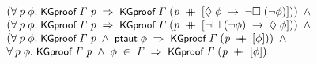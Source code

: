 \documentclass[letterpaper]{article}
\renewcommand{\HOLConst}[1]{{\textsf{\upshape\small #1}}}
\newenvironment{holmath}{\begin{displaymath}\begin{array}{l}}{\end{array}\end{displaymath}\ignorespacesafterend}
\begin{document}
\begin{holmath}
\;\;\;\;\;(\HOLSymConst{\HOLTokenForall{}}\HOLBoundVar{p}\;\HOLBoundVar{\ensuremath{\phi}}.\;\HOLConst{KGproof}\;\HOLFreeVar{\ensuremath{\Gamma}}\;\HOLBoundVar{p}\;\HOLSymConst{\HOLTokenImp{}}\;\HOLConst{KGproof}\;\HOLFreeVar{\ensuremath{\Gamma}}\;(\HOLBoundVar{p}\;\HOLSymConst{\HOLTokenDoublePlus}\;[\HOLSymConst{\ensuremath{\Diamond}}\;\HOLBoundVar{\ensuremath{\phi}}\;\HOLSymConst{\ensuremath{\rightarrow}}\;\HOLSymConst{\HOLTokenNeg{}}\HOLSymConst{\ensuremath{\Box}}\;(\HOLSymConst{\HOLTokenNeg{}}\HOLBoundVar{\ensuremath{\phi}})]))\;\HOLSymConst{\HOLTokenConj{}}\\
\;\;\;\;\;(\HOLSymConst{\HOLTokenForall{}}\HOLBoundVar{p}\;\HOLBoundVar{\ensuremath{\phi}}.\;\HOLConst{KGproof}\;\HOLFreeVar{\ensuremath{\Gamma}}\;\HOLBoundVar{p}\;\HOLSymConst{\HOLTokenImp{}}\;\HOLConst{KGproof}\;\HOLFreeVar{\ensuremath{\Gamma}}\;(\HOLBoundVar{p}\;\HOLSymConst{\HOLTokenDoublePlus}\;[\HOLSymConst{\HOLTokenNeg{}}\HOLSymConst{\ensuremath{\Box}}\;(\HOLSymConst{\HOLTokenNeg{}}\HOLBoundVar{\ensuremath{\phi}})\;\HOLSymConst{\ensuremath{\rightarrow}}\;\HOLSymConst{\ensuremath{\Diamond}}\;\HOLBoundVar{\ensuremath{\phi}}]))\;\HOLSymConst{\HOLTokenConj{}}\\
\;\;\;\;\;(\HOLSymConst{\HOLTokenForall{}}\HOLBoundVar{p}\;\HOLBoundVar{\ensuremath{\phi}}.\;\HOLConst{KGproof}\;\HOLFreeVar{\ensuremath{\Gamma}}\;\HOLBoundVar{p}\;\HOLSymConst{\HOLTokenConj{}}\;\HOLConst{ptaut}\;\HOLBoundVar{\ensuremath{\phi}}\;\HOLSymConst{\HOLTokenImp{}}\;\HOLConst{KGproof}\;\HOLFreeVar{\ensuremath{\Gamma}}\;(\HOLBoundVar{p}\;\HOLSymConst{\HOLTokenDoublePlus}\;[\HOLBoundVar{\ensuremath{\phi}}]))\;\HOLSymConst{\HOLTokenConj{}}\\
\;\;\;\;\;\HOLSymConst{\HOLTokenForall{}}\HOLBoundVar{p}\;\HOLBoundVar{\ensuremath{\phi}}.\;\HOLConst{KGproof}\;\HOLFreeVar{\ensuremath{\Gamma}}\;\HOLBoundVar{p}\;\HOLSymConst{\HOLTokenConj{}}\;\HOLBoundVar{\ensuremath{\phi}}\;\HOLSymConst{\HOLTokenIn{}}\;\HOLFreeVar{\ensuremath{\Gamma}}\;\HOLSymConst{\HOLTokenImp{}}\;\HOLConst{KGproof}\;\HOLFreeVar{\ensuremath{\Gamma}}\;(\HOLBoundVar{p}\;\HOLSymConst{\HOLTokenDoublePlus}\;[\HOLBoundVar{\ensuremath{\phi}}])
\end{holmath}
\end{document}
